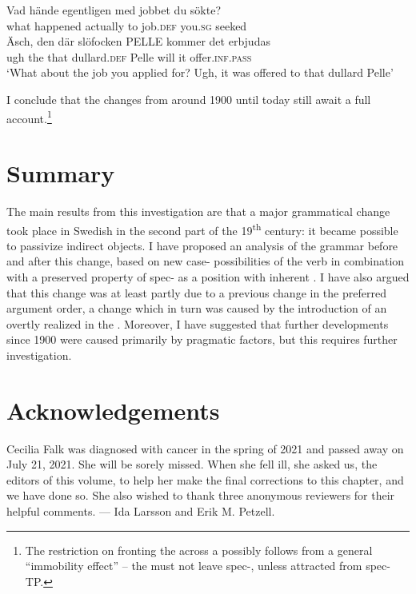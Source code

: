 \documentclass[output=paper]{langscibook}
\begin{document}
\ea%
    \label{ex:falk:28}
\gll Vad    hände    egentligen  med  jobbet    du      sökte?\\
    what    happened  actually    to    job.\textsc{def}  you.\textsc{sg}  seeked\\

\gll Äsch,  den  där  slöfocken    PELLE  kommer  det  erbjudas\\
    ugh    the  that  dullard.\textsc{def}    Pelle    will      it    offer.\textsc{inf.pass}\\
\glt ‘What about the job you applied for? Ugh, it was offered to that dullard Pelle’
\z



I conclude that the changes from around 1900 until today still await a full account.\footnote{The restriction on fronting the  across a  possibly follows from a general “immobility effect” – the  must not leave spec-, unless attracted from spec-TP.}

\section{Summary}\label{sec:falk:6}


The main results from this investigation are that a major grammatical change took place in Swedish in the second part of the 19\textsuperscript{th} century: it became possible to passivize indirect objects. I have proposed an analysis of the grammar before and after this change, based on new case- possibilities of the verb in combination with a preserved property of spec- as a position with inherent . I have also argued that this change was at least partly due to a previous change in the preferred argument order, a change which in turn was caused by the introduction of an overtly realized  in the . Moreover, I have suggested that further developments since 1900 were caused primarily by pragmatic factors, but this requires further investigation.

\section*{Acknowledgements}


Cecilia Falk was diagnosed with cancer in the spring of 2021 and passed away on July 21, 2021. She will be sorely missed. When she fell ill, she asked us, the editors of this volume, to help her make the final corrections to this chapter, and we have done so. She also wished to thank three anonymous reviewers for their helpful comments. \hfill--- Ida Larsson and Erik M. Petzell.\hbox{}\pagebreak
\end{document}
